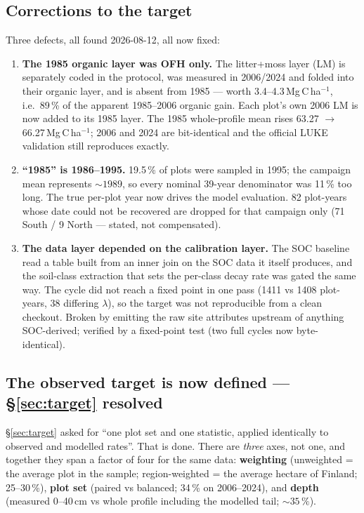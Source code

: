 \documentclass[11pt]{article}
\begin{document}
\subsection{Corrections to the target}

Three defects, all found 2026-08-12, all now fixed:

\begin{enumerate}\itemsep3pt
\item \textbf{The 1985 organic layer was OFH only.} The litter+moss layer (LM) is separately coded
  in the protocol, was measured in 2006/2024 and folded into their organic layer, and is absent
  from 1985 --- worth 3.4--4.3\,Mg\,C\,ha$^{-1}$, i.e.\ 89\,\% of the apparent 1985--2006 organic
  gain. Each plot's own 2006 LM is now added to its 1985 layer. The 1985 whole-profile mean rises
  63.27 $\rightarrow$ 66.27\,Mg\,C\,ha$^{-1}$; 2006 and 2024 are bit-identical and the official
  LUKE validation still reproduces exactly.
\item \textbf{``1985'' is 1986--1995.} 19.5\,\% of plots were sampled in 1995; the campaign mean
  represents ${\sim}1989$, so every nominal 39-year denominator was 11\,\% too long. The true
  per-plot year now drives the model evaluation. 82 plot-years whose date could not be recovered
  are dropped for that campaign only (71 South / 9 North --- stated, not compensated).
\item \textbf{The data layer depended on the calibration layer.} The SOC baseline read a table
  built from an inner join on the SOC data it itself produces, and the soil-class extraction that
  sets the per-class decay rate was gated the same way. The cycle did not reach a fixed point in
  one pass (1411 vs 1408 plot-years, 38 differing $\lambda$), so the target was not reproducible
  from a clean checkout. Broken by emitting the raw site attributes upstream of anything
  SOC-derived; verified by a fixed-point test (two full cycles now byte-identical).
\end{enumerate}

\subsection{The observed target is now defined --- \S\ref{sec:target} resolved}

\S\ref{sec:target} asked for ``one plot set and one statistic, applied identically to observed and
modelled rates''. That is done. There are \emph{three} axes, not one, and together they span a
factor of four for the same data: \textbf{weighting} (unweighted = the average plot in the sample;
region-weighted = the average hectare of Finland; 25--30\,\%), \textbf{plot set} (paired vs
balanced; 34\,\% on 2006--2024), and \textbf{depth} (measured 0--40\,cm vs whole profile including
the modelled tail; ${\sim}35\,\%$).
\end{document}

